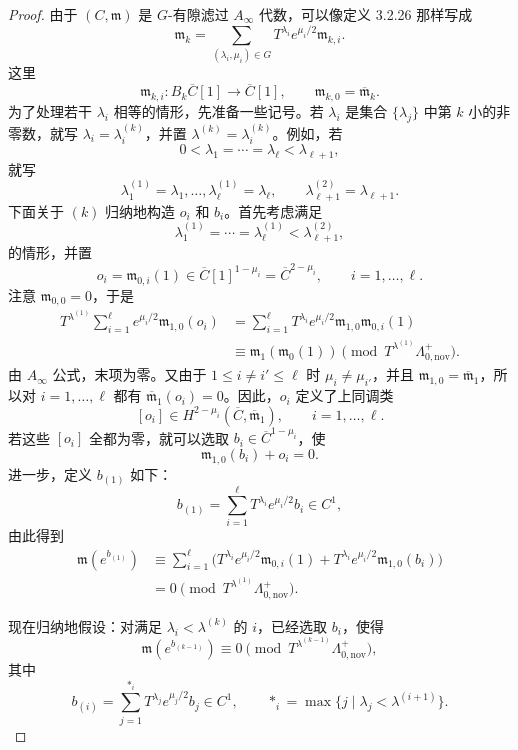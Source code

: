 \begin{proof}
由于 $(C,\mathfrak m)$ 是 $G$-有隙滤过 $A_\infty$ 代数，可以像定义
3.2.26 那样写成
\[
  \mathfrak m_k
  =\sum_{(\lambda_i,\mu_i)\in G}
   T^{\lambda_i}e^{\mu_i/2}\mathfrak m_{k,i}.
\]
这里
\[
  \mathfrak m_{k,i}\colon B_k\overline C[1]\longrightarrow\overline C[1],
  \qquad \mathfrak m_{k,0}=\overline{\mathfrak m}_k.
\]
为了处理若干 $\lambda_i$ 相等的情形，先准备一些记号。若
$\lambda_i$ 是集合 $\{\lambda_j\}$ 中第 $k$ 小的非零数，就写
$\lambda_i=\lambda_i^{(k)}$，并置
$\lambda^{(k)}=\lambda_i^{(k)}$。例如，若
\[
  0<\lambda_1=\cdots=\lambda_\ell<\lambda_{\ell+1},
\]
就写
\[
  \lambda_1^{(1)}=\lambda_1,\ldots,
  \lambda_\ell^{(1)}=\lambda_\ell,
  \qquad
  \lambda_{\ell+1}^{(2)}=\lambda_{\ell+1}.
\]
下面关于 $(k)$ 归纳地构造 $o_i$ 和 $b_i$。首先考虑满足
\[
  \lambda_1^{(1)}=\cdots=\lambda_\ell^{(1)}
  <\lambda_{\ell+1}^{(2)},
\]
的情形，并置
\[
  o_i=\mathfrak m_{0,i}(1)
  \in\overline C[1]^{1-\mu_i}
  =\overline C^{2-\mu_i},
  \qquad i=1,\ldots,\ell.
\]
注意 $\mathfrak m_{0,0}=0$，于是
\[
\begin{aligned}
  T^{\lambda^{(1)}}
  \sum_{i=1}^{\ell}e^{\mu_i/2}
  \mathfrak m_{1,0}(o_i)
  &=\sum_{i=1}^{\ell}T^{\lambda_i}e^{\mu_i/2}
    \mathfrak m_{1,0}\mathfrak m_{0,i}(1)\\
  &\equiv\mathfrak m_1(\mathfrak m_0(1))
  \pmod{T^{\lambda^{(1)}}\Lambda^+_{0,\mathrm{nov}}}.
\end{aligned}
\]
由 $A_\infty$ 公式，末项为零。又由于
$1\leq i\ne i'\leq\ell$ 时 $\mu_i\ne\mu_{i'}$，并且
$\mathfrak m_{1,0}=\overline{\mathfrak m}_1$，所以对
$i=1,\ldots,\ell$ 都有
$\overline{\mathfrak m}_1(o_i)=0$。因此，$o_i$ 定义了上同调类
\[
  [o_i]\in H^{2-\mu_i}
  (\overline C,\overline{\mathfrak m}_1),
  \qquad i=1,\ldots,\ell.
\]
若这些 $[o_i]$ 全都为零，就可以选取
$b_i\in\overline C^{1-\mu_i}$，使
\[
  \mathfrak m_{1,0}(b_i)+o_i=0.
\]
进一步，定义 $b_{(1)}$ 如下：
\[
  b_{(1)}=\sum_{i=1}^{\ell}
  T^{\lambda_i}e^{\mu_i/2}b_i\in C^1,
\]
由此得到
\begin{equation}
\begin{aligned}
  \mathfrak m(e^{b_{(1)}})
  &\equiv\sum_{i=1}^{\ell}
  \bigl(
    T^{\lambda_i}e^{\mu_i/2}\mathfrak m_{0,i}(1)
    +T^{\lambda_i}e^{\mu_i/2}\mathfrak m_{1,0}(b_i)
  \bigr)\\
  &=0
  \pmod{T^{\lambda^{(1)}}\Lambda^+_{0,\mathrm{nov}}}.
\end{aligned}
\tag{3.6.20}\label{eq:3-6-20}
\end{equation}

现在归纳地假设：对满足 $\lambda_i<\lambda^{(k)}$ 的 $i$，已经选取
$b_i$，使得
\begin{equation}
  \mathfrak m(e^{b_{(k-1)}})
  \equiv0
  \pmod{T^{\lambda^{(k-1)}}\Lambda^+_{0,\mathrm{nov}}},
  \tag{3.6.21}\label{eq:3-6-21}
\end{equation}
其中
\begin{equation}
  b_{(i)}=\sum_{j=1}^{*_{i}}
  T^{\lambda_j}e^{\mu_j/2}b_j\in C^1,
  \qquad
  *_{i}=\max\{j\mid\lambda_j<\lambda^{(i+1)}\}.
  \tag{3.6.22}\label{eq:3-6-22}
\end{equation}


\end{proof}
